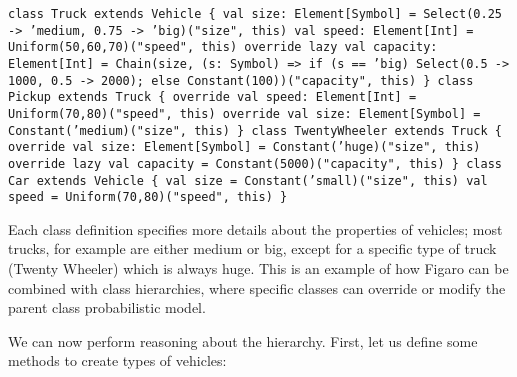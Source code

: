 \begin{flushleft}
\texttt{class Truck extends Vehicle \{
\newline val size: Element[Symbol] =
\newline \tab Select(0.25 -> 'medium, 0.75 -> 'big)("size", this)  
\newline val speed: Element[Int] = Uniform(50,60,70)("speed", this)
\newline override lazy val capacity: Element[Int] =
\newline \tab Chain(size, (s: Symbol) => if (s == 'big) Select(0.5 -> 1000, 0.5 -> 2000); else Constant(100))("capacity", this)
\newline \}
\newline 
\newline class Pickup extends Truck \{
\newline \tab override val speed: Element[Int] = Uniform(70,80)("speed", this)
\newline \tab override val size: Element[Symbol] = Constant('medium)("size", this)
\newline \}
\newline 
\newline class TwentyWheeler extends Truck \{
\newline \tab override val size: Element[Symbol] = Constant('huge)("size", this)
\newline \tab override lazy val capacity = Constant(5000)("capacity", this)
\newline \}
\newline 
\newline class Car extends Vehicle \{
\newline \tab val size = Constant('small)("size", this)
\newline \tab val speed = Uniform(70,80)("speed", this)
\newline \}
}
\end{flushleft}

Each class definition specifies more details about the properties of vehicles; most trucks, for example are either medium or big, except for a specific type of truck (Twenty Wheeler) which is always huge. This is an example of how Figaro can be combined with class hierarchies, where specific classes can override or modify the parent class probabilistic model.

We can now perform reasoning about the hierarchy. First, let us define some methods to create types of vehicles:

